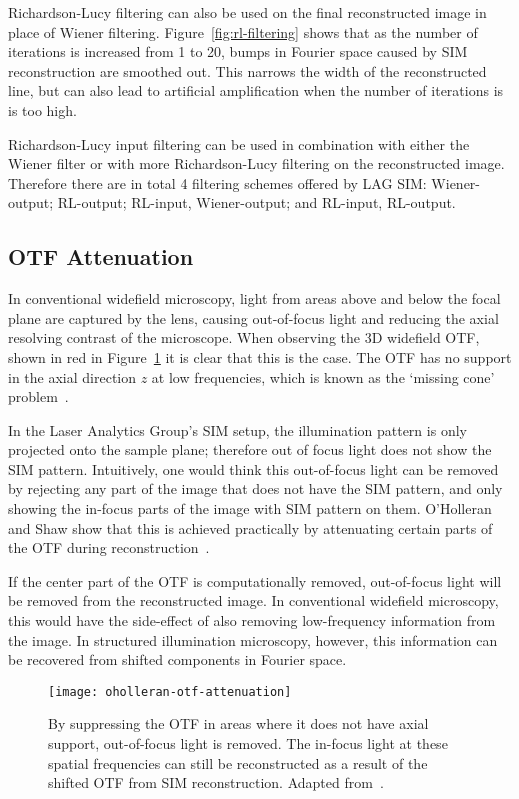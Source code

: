 Richardson-Lucy filtering can also be used on the final reconstructed image in place of Wiener filtering. 
Figure~\ref{fig:rl-filtering} shows that as the number of iterations is increased from 1 to 20, bumps in Fourier space caused by SIM reconstruction are smoothed out. 
This narrows the width of the reconstructed line, but can also lead to artificial amplification when the number of iterations is is too high. 

Richardson-Lucy input filtering can be used in combination with either the Wiener filter or with more Richardson-Lucy filtering on the reconstructed image. 
Therefore there are in total 4 filtering schemes offered by LAG SIM: Wiener-output; RL-output; RL-input, Wiener-output; and RL-input, RL-output. 

\subsection{OTF Attenuation}
In conventional widefield microscopy, light from areas above and below the focal plane are captured by the lens, causing out-of-focus light and reducing the axial resolving contrast of the microscope. 
When observing the 3D widefield OTF, shown in red in Figure~\ref{fig:oholleran-otf} it is clear that this is the case. 
The OTF has no support in the axial direction $z$ at low frequencies, which is known as the `missing cone' problem~\cite{sheppard1992significance}. 

In the Laser Analytics Group's SIM setup, the illumination pattern is only projected onto the sample plane; therefore out of focus light does not show the SIM pattern.
Intuitively, one would think this out-of-focus light can be removed by rejecting any part of the image that does not have the SIM pattern, and only showing the in-focus parts of the image with SIM pattern on them. 
O'Holleran and Shaw show that this is achieved practically by attenuating certain parts of the OTF during reconstruction~\cite{oholleran2014optimized}.

If the center part of the OTF is computationally removed, out-of-focus light will be removed from the reconstructed image.
In conventional widefield microscopy, this would have the side-effect of also removing low-frequency information from the image. 
In structured illumination microscopy, however, this information can be recovered from shifted components in Fourier space. 

\begin{figure}[htbp!]
\centering
\texttt{[image: oholleran-otf-attenuation]}
\caption[LAG SIM: OTF attenuation]{By suppressing the OTF in areas where it does not have axial support, out-of-focus light is removed. The in-focus light at these spatial frequencies can still be reconstructed as a result of the shifted OTF from SIM reconstruction. Adapted from~\cite{oholleran2014optimized}. }
\label{fig:oholleran-otf}
\end{figure}

